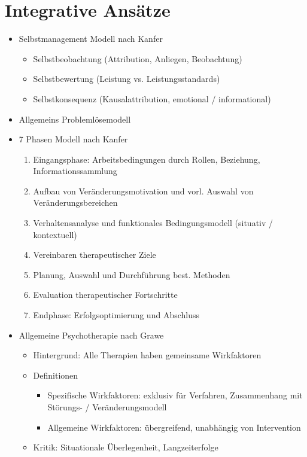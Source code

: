 \documentclass[11pt, paper=a4, twocolumn]{scrartcl}
\begin{document}
	\section{Integrative Ansätze}
		\begin{itemize}
			\item Selbstmanagement Modell nach Kanfer
				\begin{itemize}
					\item Selbstbeobachtung (Attribution, Anliegen, Beobachtung)
					\item Selbstbewertung (Leistung vs. Leistungsstandards)
					\item Selbstkonsequenz (Kausalattribution, emotional / informational)
				\end{itemize}
			\item Allgemeins Problemlösemodell
			\item 7 Phasen Modell nach Kanfer
				\begin{enumerate}
					\item Eingangsphase: Arbeitsbedingungen durch Rollen, Beziehung, Informationssammlung
					\item Aufbau von Veränderungsmotivation und vorl. Auswahl von Veränderungsbereichen
					\item Verhaltensanalyse und funktionales Bedingungsmodell (situativ / kontextuell)
					\item Vereinbaren therapeutischer Ziele
					\item Planung, Auswahl und Durchführung best. Methoden
					\item Evaluation therapeutischer Fortschritte
					\item Endphase: Erfolgsoptimierung und Abschluss
				\end{enumerate}
			\item Allgemeine Psychotherapie nach Grawe
				\begin{itemize}
					\item Hintergrund: Alle Therapien haben gemeinsame Wirkfaktoren
					\item Definitionen
						\begin{itemize}
							\item Spezifische Wirkfaktoren: exklusiv für Verfahren, Zusammenhang mit Störungs- / 
								Veränderungsmodell
							\item Allgemeine Wirkfaktoren: übergreifend, unabhängig von Intervention
						\end{itemize}
					\item Kritik: Situationale Überlegenheit, Langzeiterfolge

\end{itemize}
\end{itemize}
\end{document}
